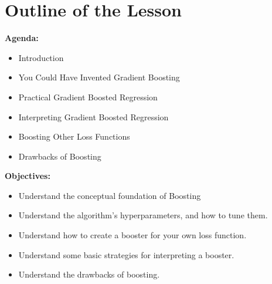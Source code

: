 \section{Outline of the Lesson}
%
\begin{frame}
\textbf{Agenda:}
 
  \begin{itemize}
    \item Introduction
    \item You Could Have Invented Gradient Boosting
    \item Practical Gradient Boosted Regression
    \item Interpreting Gradient Boosted Regression
    \item Boosting Other Loss Functions
    \item Drawbacks of Boosting
  \end{itemize}

\end{frame}
%
\begin{frame}
\textbf{Objectives:}

  \begin{itemize}
    \item Understand the conceptual foundation of Boosting
    \item Understand the algorithm's hyperparameters, and how to tune them.
    \item Understand how to create a booster for your own loss function.
    \item Understand some basic strategies for interpreting a booster.
    \item Understand the drawbacks of boosting.
  \end{itemize}
  
\end{frame}